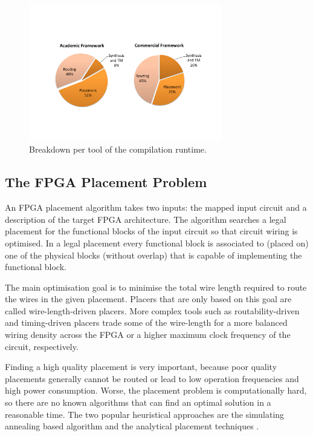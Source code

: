 \documentclass[a4paper,oneside,12pt]{article}
\begin{document}
\begin{figure}[t]
\centering
\includegraphics[width = 0.75\textwidth,trim = 0mm 50mm 0mm 40mm, clip]{runtime_breakdown}
\caption{Breakdown per tool of the compilation runtime.}
\label{rt}
\end{figure}




\subsection{The FPGA Placement Problem}
\label{sec:placeprob}
An FPGA placement algorithm takes two inputs: the mapped input circuit and a description of the target FPGA architecture. The algorithm searches a legal placement for the functional blocks of the input circuit so that circuit wiring is optimised. In a legal placement every functional block is associated to (placed on) one of the physical blocks (without overlap) that is capable of implementing the functional block.


The main optimisation goal is to minimise the total wire length required to route the wires in the given placement. Placers that are only based on this goal are called wire-length-driven placers. More complex tools such as routability-driven \cite{swartz1998afrrff} and timing-driven placers \cite{marquardt2000tpff} trade some of the wire-length for a more balanced wiring density across the FPGA or a higher maximum clock frequency of the circuit, respectively.

Finding a high quality placement is very important, because poor quality placements generally cannot be routed or lead to low operation frequencies and high power consumption. Worse, the placement problem is computationally hard, so there are no known algorithms that can find an optimal solution in a reasonable time. The two popular heuristical approaches are the simulating annealing based algorithm \cite{vprboek} and the analytical placement techniques \cite{chan2003ppffga}.
\end{document}

